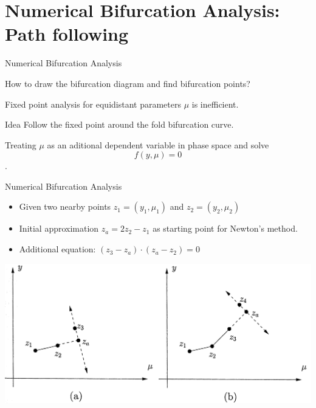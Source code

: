 \documentclass{beamer}
\begin{document}
\section{Numerical Bifurcation Analysis: Path following}
\begin{frame}{Numerical Bifurcation Analysis}
    \begin{block}{}
        How to draw the bifurcation diagram and find bifurcation points?
    \end{block}
    Fixed point analysis for equidistant parameters $\mu$ is inefficient.
    
    \begin{block}{Idea}
        Follow the fixed point around the fold bifurcation curve.
    \end{block}
    
    Treating $\mu$ as an aditional dependent variable in phase space and solve 
    $$f(y, \mu) = 0$$. 
    
\end{frame}

\begin{frame}{Numerical Bifurcation Analysis}
    
    \begin{itemize}
        \item Given two nearby points $z_{1} = (y_{1}, \mu_{1})$ and $z_2 = (y_2, \mu_2)${}
        \item Initial approximation $ z_{a} = 2 z_{2} - z_{1}$ as starting point for Newton's method.
        \item Additional equation: $(z_3 - z_a) \cdot (z_a - z_2) = 0$
    \end{itemize}
    \includegraphics[width=\textwidth]{grafik/pathfollow}

\end{frame}
\end{document}
